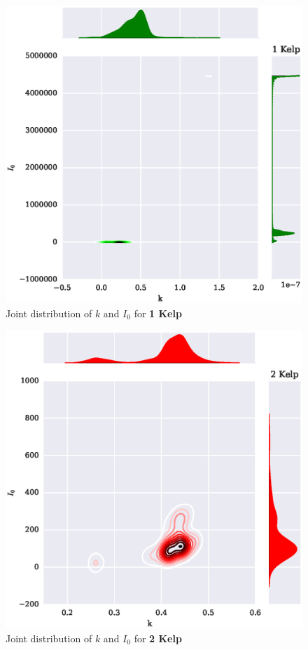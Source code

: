 \documentclass{article}
\begin{document}
\begin{figure}[H]
	\centering
	\includegraphics[width=\textwidth]{joint_1_kelp.eps}
	\caption{Joint distribution of $k$ and $I_0$ for \textbf{1 Kelp}}
	\label{joint_1_kelp}
\end{figure}

\begin{figure}[H]
	\centering
	\includegraphics[width=\textwidth]{joint_2_kelp.eps}
	\caption{Joint distribution of $k$ and $I_0$ for \textbf{2 Kelp}}
	\label{joint_2_kelp}
\end{figure}
\end{document}
